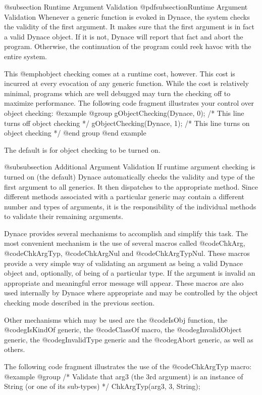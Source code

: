 @subsection Runtime Argument Validation
@pdfsubsection{Runtime Argument Validation}
Whenever a generic function is evoked in Dynace, the system checks the
validity of the first argument.  It makes sure that the first argument
is in fact a valid Dynace object.  If it is not, Dynace will report that fact
and abort the program.  Otherwise, the continuation of the program could reek
havoc with the entire system.

This @emph{object checking} comes at a runtime cost, however.  This cost
is incurred at every evocation of any generic function.  While the cost
is relatively minimal, programs which are well debugged may turn the
checking off to maximize performance.  The following code fragment
illustrates your control over object checking:
@example
@group
gObjectChecking(Dynace, 0);  /* This line turns off object checking */
gObjectChecking(Dynace, 1);  /* This line turns on  object checking */
@end group
@end example

The default is for object checking to be turned on.


@subsubsection Additional Argument Validation
If runtime argument checking is turned on (the default) Dynace
automatically checks the validity and type of the first argument to all
generics.  It then dispatches to the appropriate method.  Since
different methods associated with a particular generic may contain a
different number and types of arguments, it is the responsibility of the
individual methods to validate their remaining arguments.

Dynace provides several mechanisms to accomplish and simplify this task.
The most convenient mechanism is the use of several macros called
@code{ChkArg}, @code{ChkArgTyp}, @code{ChkArgNul} and
@code{ChkArgTypNul}.  These macros provide a very simple way of
validating an argument as being a valid Dynace object and, optionally,
of being of a particular type.  If the argument is invalid an
appropriate and meaningful error message will appear.  These macros are
also used internally by Dynace where appropriate and may be controlled
by the object checking mode described in the previous section.

Other mechanisms which may be used are the @code{IsObj} function, the
@code{gIsKindOf} generic, the @code{ClassOf} macro, the
@code{gInvalidObject} generic, the @code{gInvalidType} generic and the
@code{gAbort} generic, as well as others.

The following code fragment illustrates the use of the @code{ChkArgTyp}
macro:
@example
@group
/*  Validate that arg3 (the 3rd argument) is an instance of String
    (or one of its sub-types)  */
ChkArgTyp(arg3, 3, String);

